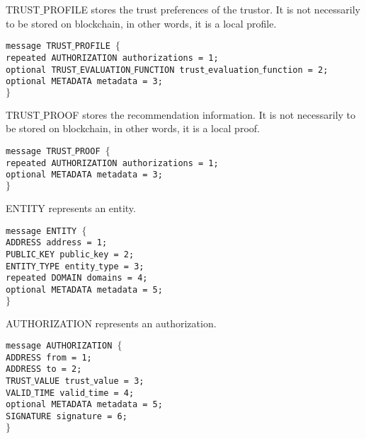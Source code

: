 \documentclass{article}
\begin{document}
TRUST$\_$PROFILE stores the trust preferences of the trustor. It is not necessarily to be stored on blockchain, in other words, it is a local profile.


\texttt{message TRUST$\_$PROFILE $\{$\\
\hspace*{2.ex} repeated AUTHORIZATION authorizations = 1;\\
\hspace*{2.ex} optional TRUST$\_$EVALUATION$\_$FUNCTION trust$\_$evaluation$\_$function = 2;\\
\hspace*{2.ex} optional METADATA metadata = 3;\\
$\}$}

TRUST$\_$PROOF stores the recommendation information. It is not necessarily to be stored on blockchain, in other words, it is a local proof.


\texttt{message TRUST$\_$PROOF $\{$\\
\hspace*{2.ex} repeated AUTHORIZATION authorizations = 1;\\
\hspace*{2.ex} optional METADATA metadata = 3;\\
$\}$}

ENTITY represents an entity.


\texttt{message ENTITY $\{$\\
\hspace*{2.ex} ADDRESS address = 1;\\
\hspace*{2.ex} PUBLIC$\_$KEY public$\_$key = 2;\\
\hspace*{2.ex} ENTITY$\_$TYPE entity$\_$type = 3;\\
\hspace*{2.ex} repeated DOMAIN domains = 4;\\
\hspace*{2.ex} optional METADATA metadata = 5;\\
$\}$}

AUTHORIZATION represents an authorization.


\texttt{message AUTHORIZATION $\{$\\
\hspace*{2.ex} ADDRESS from = 1;\\
\hspace*{2.ex} ADDRESS to = 2;\\
\hspace*{2.ex} TRUST$\_$VALUE trust$\_$value = 3;\\
\hspace*{2.ex} VALID$\_$TIME valid$\_$time = 4;\\
\hspace*{2.ex} optional METADATA metadata = 5;\\
\hspace*{2.ex} SIGNATURE signature = 6;\\
$\}$}
\end{document}
